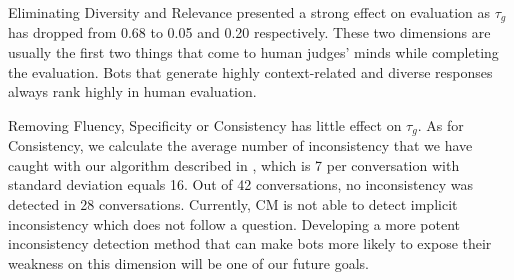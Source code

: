 Eliminating Diversity and Relevance presented a strong effect on evaluation as $\tau_{g}$ has dropped from 0.68 to 0.05 and 0.20 respectively. 
These two dimensions are usually the first two things that come to human judges' minds while completing the evaluation. Bots that generate highly context-related and diverse responses always rank highly in human evaluation.

Removing Fluency, Specificity or Consistency has little effect on $\tau_{g}$. As for Consistency, we calculate the average number of inconsistency that we have caught 
with our algorithm described in , which is 7 per conversation with standard deviation equals 16. 
Out of 42 conversations, no inconsistency was detected in 28 conversations. 
Currently, CM is not able to detect implicit inconsistency which does not follow a question. 
Developing a more potent inconsistency detection method
that can make bots more likely to 
expose their weakness on this dimension
 will be one of our future goals.


